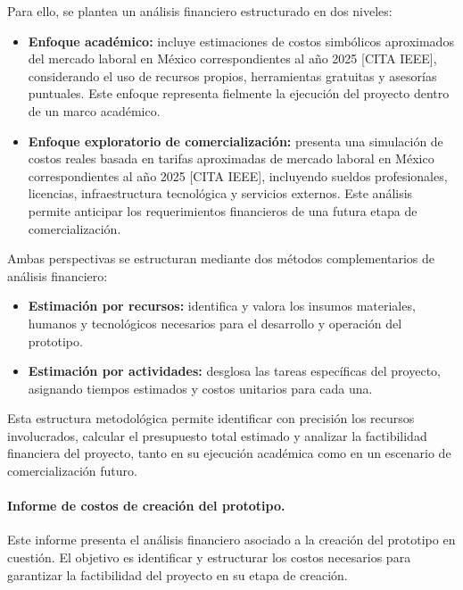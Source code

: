 Para ello, se plantea un análisis financiero estructurado en dos niveles: 

\begin{itemize}
	\item \textbf{Enfoque académico:} incluye estimaciones de costos simbólicos aproximados del mercado laboral en México correspondientes al año 2025 [CITA IEEE], considerando el uso de recursos propios, herramientas gratuitas y asesorías puntuales. Este enfoque representa fielmente la ejecución del proyecto dentro de un marco académico.
	
	\item \textbf{Enfoque exploratorio de comercialización:} presenta una simulación de costos reales basada en tarifas aproximadas de mercado laboral en México correspondientes al año 2025 [CITA IEEE], incluyendo sueldos profesionales, licencias, infraestructura tecnológica y servicios externos. Este análisis permite anticipar los requerimientos financieros de una futura etapa de comercialización.
\end{itemize}

Ambas perspectivas se estructuran mediante dos métodos complementarios de análisis financiero:

\begin{itemize}
	\item \textbf{Estimación por recursos:} identifica y valora los insumos materiales, humanos y tecnológicos necesarios para el desarrollo y operación del prototipo.
	\item \textbf{Estimación por actividades:} desglosa las tareas específicas del proyecto, asignando tiempos estimados y costos unitarios para cada una.
\end{itemize}

Esta estructura metodológica permite identificar con precisión los recursos involucrados, calcular el presupuesto total estimado y analizar la factibilidad financiera del proyecto, tanto en su ejecución académica como en un escenario de comercialización futuro.

\paragraph{\textbf{Informe de costos de creación del prototipo.}} 
Este informe presenta el análisis financiero asociado a la creación del prototipo en cuestión. El objetivo es identificar y estructurar los costos necesarios para garantizar la factibilidad del proyecto en su etapa de creación.

